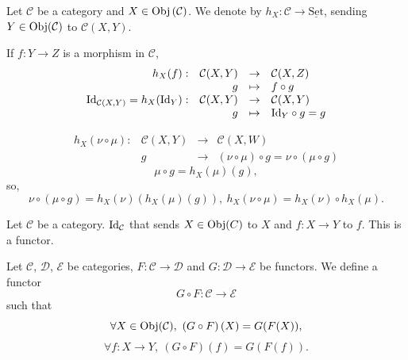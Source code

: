 \begin{exampleenv}
    Let $\mathcal{C}$ be a category and $X\in\mathrm{Obj}\left(\mathcal{C}\right)$. We denote by $h_X:\mathcal{C}\rightarrow\underline{\mathrm{Set}}$, sending $Y\in \mathrm{Obj}(\mathcal{C})$ to $\mathcal{C}(X,Y)$.

    If $f:Y\rightarrow Z$ is a morphism in $\mathcal{C}$,
    $$\begin{array}{rrcl}
        h_X(f):& \mathcal{C}(X,Y)&\rightarrow &\mathcal{C}(X,Z)\\
        & g&\mapsto&f\circ g\\
        \mathrm{Id}_{\mathcal{C}(X,Y)}=h_X(\mathrm{Id}_Y):&\mathcal{C}(X,Y)&\rightarrow & \mathcal{C}(X,Y)\\
        & g&\mapsto& \mathrm{Id}_Y\circ g = g
    \end{array}
    $$
        \begin{center}
\end{center}
$$\begin{array}{rrcl}
    h_X\left(\nu\circ\mu\right):&\mathcal{C}(X,Y) & \rightarrow &\mathcal{C}(X,W)\\
    & g &\rightarrow &\left(\nu\circ\mu\right)\circ g = \nu\circ \left(\mu\circ g\right)
\end{array}
$$
$$\mu\circ g = h_X(\mu)(g),$$
so,
$$\nu\circ\left(\mu\circ g\right) = h_X(\nu)\left(h_X(\mu)(g)\right),\ h_X(\nu\circ\mu) = h_X(\nu)\circ h_X(\mu).$$
\end{exampleenv}
\begin{exampleenv}
    Let $\mathcal{C}$ be a category. $\mathrm{Id}_\mathcal{C}$ that sends $X\in \mathrm{Obj}(C)$ to $X$ and $f:X\rightarrow Y$ to $f$. This is a functor.
\end{exampleenv}
\begin{exampleenv}
    Let $\mathcal{C}$, $\mathcal{D}$, $\mathcal{E}$ be categories, $F:\mathcal{C}\rightarrow\mathcal{D}$ and $G:\mathcal{D}\rightarrow\mathcal{E}$ be functors. We define a functor
    $$G\circ F:\mathcal{C}\rightarrow \mathcal{E}$$
    such that 
    $$\forall X\in \Obj(\mathcal{C}),\ \left(G\circ F\right)(X)=G(F(X)),$$
    $$\forall f:X\rightarrow Y,\ \left(G\circ F\right)(f) = G(F(f)).$$
\end{exampleenv}
